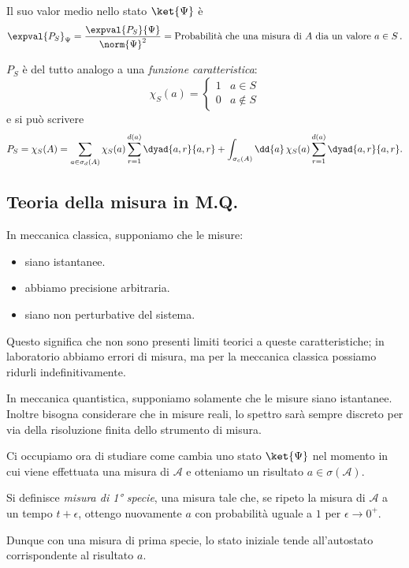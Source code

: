 Il suo valor medio nello stato \(\ket{\Psi}\) è
\[
    \expval{P_S}_\Psi = \frac{\expval{P_S}{\Psi}}{\norm{\Psi}^2}
    = \text{Probabilità che una misura di } A \text{ dia un valore } a \in S\,.
\]

\begin{remark}
    \(P_S\) è del tutto analogo a una \textit{funzione caratteristica}:
    \[
        \chi_S(a) =
        \begin{cases}
            1 & a \in S \\
            0 & a \notin S
        \end{cases}
    \]
    e si può scrivere
    \begin{equation}
        P_S = \chi_S(A)
        = \sum_{a \in \sigma_d(A)} \chi_S(a) \sum_{r=1}^{d(a)} \dyad{a,r}{a,r}
        + \int_{\sigma_c(A)} \dd{a}\, \chi_S(a) \sum_{r=1}^{d(a)} \dyad{a,r}{a,r}.
    \end{equation}
\end{remark}

    
\subsection{Teoria della misura in M.Q.}
In meccanica classica, supponiamo che le misure:
\begin{itemize}
    \item siano istantanee.
    \item abbiamo precisione arbitraria.
    \item siano non perturbative del sistema.
\end{itemize}

Questo significa che non sono presenti limiti teorici a queste caratteristiche; in laboratorio abbiamo errori di misura, ma per la meccanica classica possiamo ridurli indefinitivamente.

In meccanica quantistica, supponiamo solamente che le misure siano istantanee. Inoltre bisogna considerare che in misure reali, lo spettro sarà sempre discreto per via della risoluzione finita dello strumento di misura.

Ci occupiamo ora di studiare come cambia uno stato \(\ket{\Psi}\) nel momento in cui viene effettuata una misura di \(\mathcal{A}\) e otteniamo un risultato \(a \in \sigma(\mathcal{A})\).

\begin{definition}
    Si definisce \textit{misura di 1° specie}, una misura tale che, se ripeto la misura di \(\mathcal{A}\) a un tempo
    \(t+ \epsilon\), ottengo nuovamente \(a\) con probabilità uguale a \(1\) per \(\epsilon\to 0^+\).
\end{definition}
Dunque con una misura di prima specie, lo stato iniziale tende all'autostato corrispondente al risultato \(a\).

